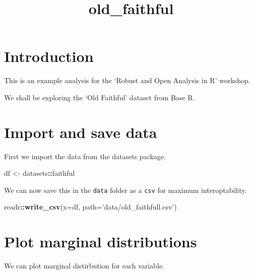 \documentclass[]{article}
\title{old\_faithful}
\author{}
\date{}
\newenvironment{Shaded}{\begin{snugshade}}{\end{snugshade}}
\newcommand{\DataTypeTok}[1]{\textcolor[rgb]{0.13,0.29,0.53}{#1}}
\newcommand{\KeywordTok}[1]{\textcolor[rgb]{0.13,0.29,0.53}{\textbf{#1}}}
\newcommand{\NormalTok}[1]{#1}
\newcommand{\OperatorTok}[1]{\textcolor[rgb]{0.81,0.36,0.00}{\textbf{#1}}}
\newcommand{\StringTok}[1]{\textcolor[rgb]{0.31,0.60,0.02}{#1}}
\begin{document}
\maketitle

\hypertarget{introduction}{%
\section{Introduction}\label{introduction}}

This is an example analysis for the `Robust and Open Analysis in R'
workshop.

We shall be exploring the `Old Faithful' dataset from Base R.

\hypertarget{import-and-save-data}{%
\section{Import and save data}\label{import-and-save-data}}

First we import the data from the datasets package.

\begin{Shaded}
\begin{Highlighting}[]
\NormalTok{df <-}\StringTok{ }\NormalTok{datasets}\OperatorTok{::}\NormalTok{faithful}
\end{Highlighting}
\end{Shaded}

We can now save this in the \texttt{data} folder as a \texttt{csv} for
maximum interoptability.

\begin{Shaded}
\begin{Highlighting}[]
\NormalTok{readr}\OperatorTok{::}\KeywordTok{write_csv}\NormalTok{(}\DataTypeTok{x=}\NormalTok{df, }\DataTypeTok{path=}\StringTok{'data/old_faithfull.csv'}\NormalTok{)}
\end{Highlighting}
\end{Shaded}

\hypertarget{plot-marginal-distributions}{%
\section{Plot marginal
distributions}\label{plot-marginal-distributions}}

We can plot marginal distirbution for each variable.

\begin{Shaded}
\end{Shaded}
\end{document}
